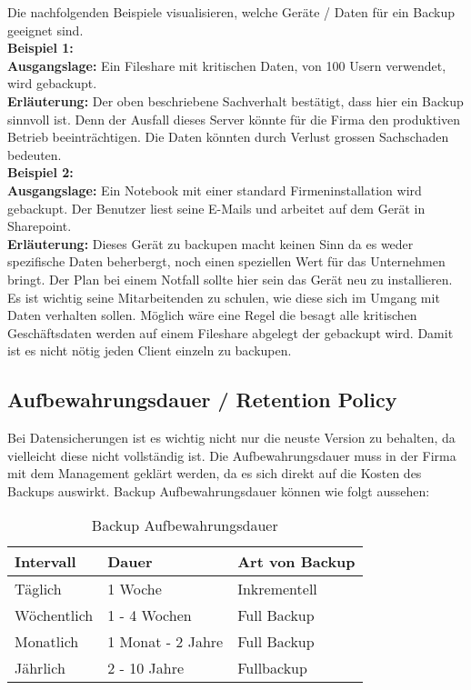 Die nachfolgenden Beispiele visualisieren, welche Geräte / Daten für ein Backup geeignet sind.\\


\textbf{Beispiel 1:}\\
\textbf{Ausgangslage:} Ein Fileshare mit kritischen Daten, von 100 Usern verwendet, wird gebackupt.\\
\textbf{Erläuterung:} Der oben beschriebene Sachverhalt bestätigt, dass hier ein Backup sinnvoll ist. Denn der Ausfall dieses Server könnte für die Firma den produktiven Betrieb beeinträchtigen. Die Daten könnten durch Verlust grossen Sachschaden bedeuten.\\


\textbf{Beispiel 2:}\\
\textbf{Ausgangslage:} Ein Notebook mit einer standard Firmeninstallation wird gebackupt. Der Benutzer liest seine E-Mails und arbeitet auf dem Gerät in Sharepoint.\\
\textbf{Erläuterung:} Dieses Gerät zu backupen macht keinen Sinn da es weder spezifische Daten beherbergt, noch einen speziellen Wert für das Unternehmen bringt. Der Plan bei einem Notfall sollte hier sein das Gerät neu zu installieren.\\

Es ist wichtig seine Mitarbeitenden zu schulen, wie diese sich im Umgang mit Daten verhalten sollen.
Möglich wäre eine Regel die besagt alle kritischen Geschäftsdaten werden auf einem Fileshare abgelegt der gebackupt wird.
Damit ist es nicht nötig jeden Client einzeln zu backupen.

\subsection{Aufbewahrungsdauer / Retention Policy}
Bei Datensicherungen ist es wichtig nicht nur die neuste Version zu behalten, da vielleicht diese nicht vollständig ist.
Die Aufbewahrungsdauer muss in der Firma mit dem Management geklärt werden, da es sich direkt auf die Kosten des Backups auswirkt.
Backup Aufbewahrungsdauer können wie folgt aussehen:\\
\begin{table}[H]
    \begin{center}
        \begin{tabular}{l|l|l}
            \hline
            Intervall    & Dauer             & Art von Backup\\
            \hline
            Täglich      & 1 Woche           & Inkrementell\\
            Wöchentlich  & 1 - 4 Wochen      & Full Backup\\
            Monatlich    & 1 Monat - 2 Jahre & Full Backup\\
            Jährlich     & 2 - 10 Jahre      & Fullbackup\\
            \hline
        \end{tabular}
    \end{center}
    \caption{Backup Aufbewahrungsdauer}
\end{table}


